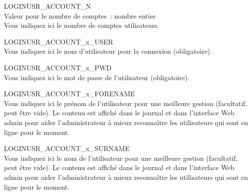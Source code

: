 \begin{description}


  LOGINUSR\_ACCOUNT\_N\\
  Valeur pour le nombre de comptes~: nombre entier\\
  Vous indiquez ici le nombre de comptes utilisateurs.



  LOGINUSR\_ACCOUNT\_x\_USER\\
  Vous indiquez ici le nom d'utilisateur pour la connexion (obligatoire).



  LOGINUSR\_ACCOUNT\_x\_PWD\\
  Vous indiquez ici le mot de passe de l'utilisateur (obligatoire).



  LOGINUSR\_ACCOUNT\_x\_FORENAME\\
  Vous indiquez ici le prénom de l'utilisateur pour une meilleure gestion
  (facultatif, peut être vide). Le contenu est affiché dans le journal et
  dans l'interface Web admin pour aider l'administrateur à mieux reconnaître
  les utilisateurs qui sont en ligne pour le moment.



  LOGINUSR\_ACCOUNT\_x\_SURNAME\\
  Vous indiquez ici le nom de l'utilisateur pour une meilleure gestion
  (facultatif, peut être vide). Le contenu est affiché dans le journal et
  dans l'interface Web admin pour aider l'administrateur à mieux reconnaître
  les utilisateurs qui sont en ligne pour le moment.



\end{description}
